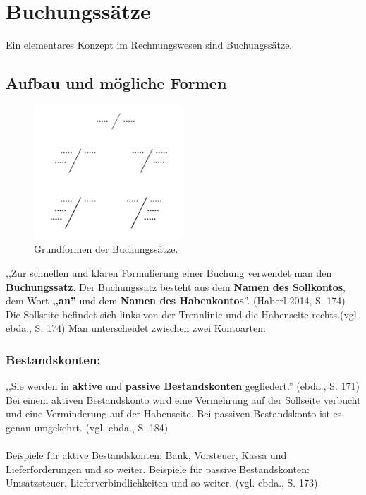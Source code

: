 \documentclass[12pt]{report}
\begin{document}
 
\section{Buchungssätze}
Ein elementares Konzept im Rechnungswesen sind Buchungssätze. 
 
\subsection{Aufbau und mögliche Formen}
 
\begin{figure}[h]
	\centering
	\includegraphics[height=5cm]{images/bs_types}
	\caption[Buchungssatzarten]{Grundformen der Buchungssätze.}
\end{figure}
  
\noindent ,,Zur schnellen und klaren Formulierung einer Buchung verwendet man den \textbf{Buchungssatz}. Der Buchungssatz besteht aus dem \textbf{Namen des Sollkontos}, dem Wort \textbf{,,an''} und dem \textbf{Namen des Habenkontos}''. (Haberl 2014, S. 174\nocite{RW1}) Die Sollseite befindet sich links von der Trennlinie und die Habenseite rechts.(vgl. ebda., S. 174\nocite{RW1}) Man unterscheidet zwischen zwei Kontoarten: \\

\subsubsection{Bestandskonten:}
,,Sie werden in \textbf{aktive} und \textbf{passive Bestandskonten} gegliedert.'' (ebda., S. 171\nocite{RW1}) Bei einem aktiven Bestandskonto wird eine Vermehrung auf der Sollseite verbucht und eine Verminderung auf der Habenseite. Bei passiven Bestandskonto ist es genau umgekehrt. (vgl. ebda., S. 184\nocite{RW1}) \\\\
Beispiele für aktive Bestandskonten: Bank, Vorsteuer, Kassa und Lieferforderungen und so weiter.
Beispiele für passive Bestandskonten: Umsatzsteuer, Lieferverbindlichkeiten und so weiter. (vgl. ebda., S. 173\nocite{RW1})
\end{document}
